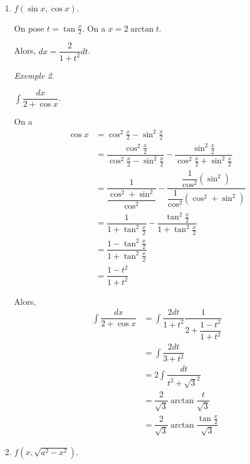 \documentclass{report}
\theoremstyle{definition}
\theoremstyle{remark}
\newtheorem*{exem}{Exemple}
\begin{document}
\begin{enumerate}
\begin{exem}
			Alors, $dt = (-1) (u^2-1)^{-2} (2u) du$.

			Ainsi,
			\begin{align*}
				\dfrac{1}{2} \int t^{-3} \left( \dfrac{1+t}{t} \right)^{\sfrac{-1}{2}} dt&= -\dfrac{1}{2} \int (u^2-1)^3 u^{-1} (u^2-1)^{-1} 2udu\\
				&= -\int (u^2-1) du
			\end{align*}
		\end{exem}
		\item $f(\sin x, \cos x)$.

		On pose $t=\tan\frac{x}{2}$. On a $x=2 \arctan t$.

		Alors, $dx = \dfrac{2}{1+t^2} dt$.
		\begin{exem}~

			$\displaystyle\int \dfrac{dx}{2+\cos x}$.

			On a
			\begin{align*}
				\cos x&= \cos^2\frac{x}{2} - \sin^2\frac{x}{2}\\
				&= \dfrac{\cos^2\frac{x}{2}} {\cos^2\frac{x}{2} - \sin^2\frac{x}{2}} - \dfrac{\sin^2\frac{x}{2}} {\cos^2\frac{x}{2} + \sin^2\frac{x}{2}}\\
				&= \dfrac{1}{\dfrac{\cos^2 + \sin^2} {\cos^2}} - \dfrac{\dfrac{1}{\cos^2} (\sin^2)} {\dfrac{1}{\cos^2} (\cos^2 + \sin^2)}\\
				&= \dfrac{1}{1 + \tan^2 \frac{x}{2}} - \dfrac{\tan^2 \frac{x}{2}} {1 + \tan^2 \frac{x}{2}}\\
				&= \dfrac{1 - \tan^2 \frac{x}{2}}{1 + \tan^2 \frac{x}{2}}\\
				&= \dfrac{1-t^2}{1+t^2}
			\end{align*}

			Alors,
			\begin{align*}
				\int\dfrac{dx}{2+\cos x}&= \int\dfrac{2dt}{1+t^2} \dfrac{1}{2 + \dfrac{1 - t^2}{1 + t^2}}\\
				&= \int\dfrac{2dt}{3+t^2}\\
				&= 2\int\dfrac{dt}{t^2+\sqrt{3}^2}\\
				&= \dfrac{2}{\sqrt{3}} \arctan\dfrac{t}{\sqrt{3}}\\
				&= \dfrac{2}{\sqrt{3}} \arctan \dfrac{\tan \frac{x}{2}}{\sqrt{3}}
			\end{align*}
		\end{exem}
		\item $f\left( x,\sqrt{a^2-x^2} \right)$.


\end{enumerate}
\end{document}
